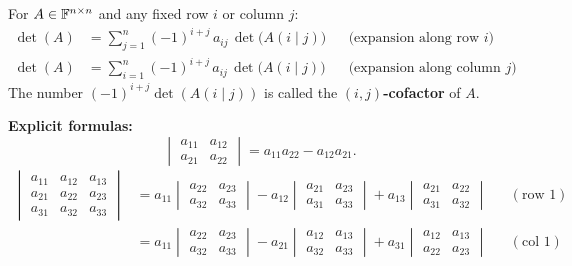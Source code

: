 \begin{flowbox}
\label{flow:det-expansion}
For $A\in\mathbb{F}^{n\times n}$ and any fixed row $i$ or column $j$:
\begin{align*}
    \det(A) &= \sum_{j=1}^{n}(-1)^{i+j}\,a_{ij}\,\det\!\bigl(A(i\mid j)\bigr)
               &&\text{(expansion along row }i\text{)}\\[4pt]
    \det(A) &= \sum_{i=1}^{n}(-1)^{i+j}\,a_{ij}\,\det\!\bigl(A(i\mid j)\bigr)
               &&\text{(expansion along column }j\text{)}
\end{align*}
The number $(-1)^{i+j}\det(A(i\mid j))$ is called the \textbf{$(i,j)$-cofactor} of $A$.

\medskip
\textbf{Explicit formulas:}
\[
    \begin{vmatrix}a_{11}&a_{12}\\a_{21}&a_{22}\end{vmatrix}
    = a_{11}a_{22}-a_{12}a_{21}.
\]
\begin{align*}
    \begin{vmatrix}
        a_{11}&a_{12}&a_{13}\\a_{21}&a_{22}&a_{23}\\a_{31}&a_{32}&a_{33}
    \end{vmatrix}
    &= a_{11}\begin{vmatrix}a_{22}&a_{23}\\a_{32}&a_{33}\end{vmatrix}
      -a_{12}\begin{vmatrix}a_{21}&a_{23}\\a_{31}&a_{33}\end{vmatrix}
      +a_{13}\begin{vmatrix}a_{21}&a_{22}\\a_{31}&a_{32}\end{vmatrix}
      &&(\text{row }1)\\[4pt]
    &= a_{11}\begin{vmatrix}a_{22}&a_{23}\\a_{32}&a_{33}\end{vmatrix}
      -a_{21}\begin{vmatrix}a_{12}&a_{13}\\a_{32}&a_{33}\end{vmatrix}
      +a_{31}\begin{vmatrix}a_{12}&a_{13}\\a_{22}&a_{23}\end{vmatrix}
      &&(\text{col }1)
\end{align*}
\end{flowbox}

